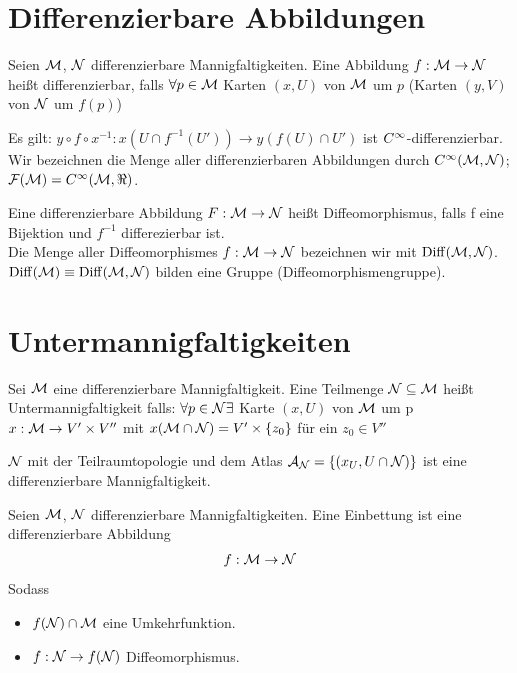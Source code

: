\section{Differenzierbare Abbildungen}
\begin{defs}
Seien $\mathcal{M}$, $\mathcal{N}$ differenzierbare Mannigfaltigkeiten. 
Eine Abbildung $f: \mathcal{M} \to \mathcal{N}$ heißt differenzierbar, falls $\forall p \in \mathcal{M}$ Karten $(x, U)$ von $\mathcal{M}$ um $p$ (Karten $(y, V)$ von $\mathcal{N}$ um $f(p)$)
\end{defs}
Es gilt: $y \circ f \circ x^{-1}: x(U \cap f^{-1} (U')) \to y(f(U) \cap U')$ ist $C^\infty$-differenzierbar.
Wir bezeichnen die Menge aller differenzierbaren Abbildungen durch $C^\infty(\mathcal{M}, \mathcal{N})$; $\mathcal{F}(\mfk) = \cinf(\mfk, \real)$.

\begin{defs}[Diffeomorphismus]
Eine differenzierbare Abbildung $F: \mathcal{M} \to \mathcal{N}$ heißt Diffeomorphismus, falls f eine Bijektion und $f^{-1}$ differezierbar ist. \\
Die Menge aller Diffeomorphismes $f: \mathcal{M} \to \mathcal{N}$ bezeichnen wir mit $\operatorname{Diff}(\mathcal{M}, \mathcal{N})$.
$\operatorname{Diff}(\mathcal{M}) \equiv \operatorname{Diff}(\mathcal{M}, \mathcal{N})$ bilden eine Gruppe (Diffeomorphismengruppe).
\end{defs}


\section{Untermannigfaltigkeiten}

\begin{defs}[Untermannigfaltigkeiten]
Sei $\mathcal{M}$ eine differenzierbare Mannigfaltigkeit. 
Eine Teilmenge $\mathcal{N} \subseteq \mathcal{M}$ heißt Untermannigfaltigkeit falls:
$\forall p \in \mathcal{N} \exists$ Karte $(x, U)$ von $\mathcal{M}$ um p $x: \mathcal{M} \to V' \times V''$ mit $x(\mathcal{M} \cap \mathcal{N}) = V' \times \{z_0 \}$
für ein $z_0 \in V''$
\end{defs}


\begin{bem}
$\mathcal{N}$ mit der Teilraumtopologie und dem Atlas $\mathcal{A}_{\mathcal{N}} = \{ (x_U, U \cap \mathcal{N} ) \}$ ist eine differenzierbare Mannigfaltigkeit.
\end{bem}

\begin{defs}[Einbettung]
Seien $\mathcal{M}$, $\mathcal{N}$ differenzierbare Mannigfaltigkeiten. 
Eine Einbettung ist eine differenzierbare Abbildung
\begin{align}
f: \mathcal{M} \to \mathcal{N} 
\end{align}
Sodass
\begin{itemize}
\item $f(\mathcal{N}) \cap \mathcal{M}$ eine Umkehrfunktion.
\item $f: \mathcal{N} \to f(\mathcal{N})$ Diffeomorphismus.
\end{itemize}
\end{defs}


